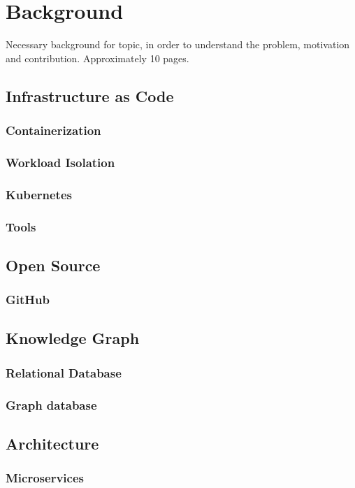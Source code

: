 \chapter{Background}
Necessary background for topic, in order to understand the problem, motivation and contribution. Approximately 10 pages.

\section{Infrastructure as Code}
\subsection{Containerization}
\subsection{Workload Isolation}
\subsection{Kubernetes}
\subsection{Tools}

\section{Open Source}
\subsection{GitHub}

\section{Knowledge Graph}
\subsection{Relational Database}
\subsection{Graph database}

\section{Architecture}
\subsection{Microservices}
